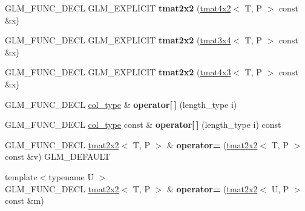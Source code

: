 \begin{DoxyCompactItemize}
\item 
\mbox{\label{structglm_1_1tmat2x2_a470191296126147372f7ba04535e01fb}} 
G\+L\+M\+\_\+\+F\+U\+N\+C\+\_\+\+D\+E\+CL G\+L\+M\+\_\+\+E\+X\+P\+L\+I\+C\+IT {\bfseries tmat2x2} (\hyperlink{structglm_1_1tmat4x2}{tmat4x2}$<$ T, P $>$ const \&x)
\item 
\mbox{\label{structglm_1_1tmat2x2_abb5235dd0bc0f2aced04e5dcba22e040}} 
G\+L\+M\+\_\+\+F\+U\+N\+C\+\_\+\+D\+E\+CL G\+L\+M\+\_\+\+E\+X\+P\+L\+I\+C\+IT {\bfseries tmat2x2} (\hyperlink{structglm_1_1tmat3x4}{tmat3x4}$<$ T, P $>$ const \&x)
\item 
\mbox{\label{structglm_1_1tmat2x2_a66947436834c7b463eb5d08c5aa6ef19}} 
G\+L\+M\+\_\+\+F\+U\+N\+C\+\_\+\+D\+E\+CL G\+L\+M\+\_\+\+E\+X\+P\+L\+I\+C\+IT {\bfseries tmat2x2} (\hyperlink{structglm_1_1tmat4x3}{tmat4x3}$<$ T, P $>$ const \&x)
\item 
\mbox{\label{structglm_1_1tmat2x2_ae9e51d1d6b2d5f3ed9e42da1945b7998}} 
G\+L\+M\+\_\+\+F\+U\+N\+C\+\_\+\+D\+E\+CL \hyperlink{structglm_1_1tvec2}{col\+\_\+type} \& {\bfseries operator\mbox{[}$\,$\mbox{]}} (length\+\_\+type i)
\item 
\mbox{\label{structglm_1_1tmat2x2_a87ea7b7b3dc1e2a6d906942e73bbf72c}} 
G\+L\+M\+\_\+\+F\+U\+N\+C\+\_\+\+D\+E\+CL \hyperlink{structglm_1_1tvec2}{col\+\_\+type} const  \& {\bfseries operator\mbox{[}$\,$\mbox{]}} (length\+\_\+type i) const
\item 
\mbox{\label{structglm_1_1tmat2x2_a1ac298c5914990ffb37bb71d462648e5}} 
G\+L\+M\+\_\+\+F\+U\+N\+C\+\_\+\+D\+E\+CL \hyperlink{structglm_1_1tmat2x2}{tmat2x2}$<$ T, P $>$ \& {\bfseries operator=} (\hyperlink{structglm_1_1tmat2x2}{tmat2x2}$<$ T, P $>$ const \&v) G\+L\+M\+\_\+\+D\+E\+F\+A\+U\+LT
\item 
\mbox{\label{structglm_1_1tmat2x2_a825289bb785c04c724709112352b9dc6}} 
{\footnotesize template$<$typename U $>$ }\\G\+L\+M\+\_\+\+F\+U\+N\+C\+\_\+\+D\+E\+CL \hyperlink{structglm_1_1tmat2x2}{tmat2x2}$<$ T, P $>$ \& {\bfseries operator=} (\hyperlink{structglm_1_1tmat2x2}{tmat2x2}$<$ U, P $>$ const \&m)

\end{DoxyCompactItemize}
